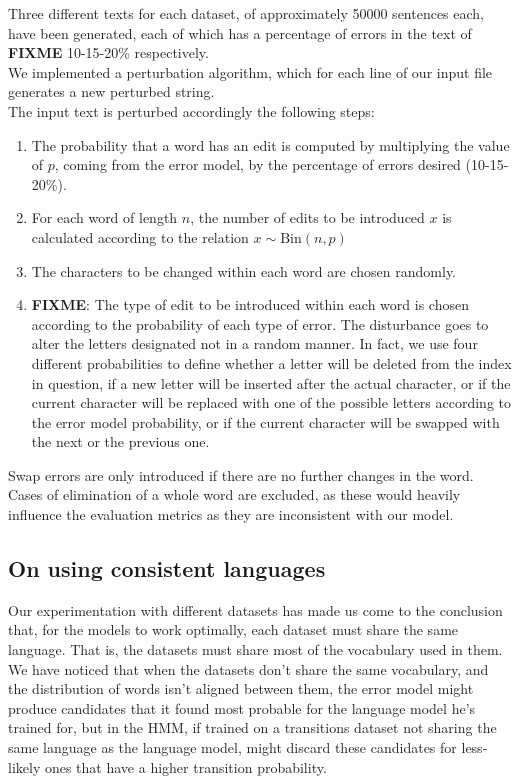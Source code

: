Three different texts for each dataset, of approximately \num{50000} sentences each, have been generated, 
each of which has a percentage of errors in the text of \textbf{FIXME} \num{10}-\num{15}-\num{20}\% 
respectively. \\

We implemented a perturbation algorithm, which for each line of our input file generates a new perturbed 
string.\\
The input text is perturbed accordingly the following steps:

\begin{enumerate}
	\item The probability that a word has an edit is computed by multiplying the value of $p$, coming from the 
	error model, by the percentage of errors desired (10-15-20\%).
	\item For each word of length $n$, the number of edits to be introduced $x$ is calculated according to the 
	relation $x \sim \text{Bin}(n, p)$
	\item The characters to be changed within each word are chosen randomly.
	\item \textbf{FIXME}: The type of edit to be introduced within each word is chosen according to the 
	probability of each type of error. 
	The disturbance goes to alter the letters designated not in a random manner. 
	In fact, we use four different probabilities to define whether a letter will be deleted from the index in question, 
	if a new letter will be inserted after the actual character, or if the current character will be replaced with one of 
	the possible letters according to the error model probability, or if the current character will be swapped with 
	the next or the previous one.
	
\end{enumerate}

Swap errors are only introduced if there are no further changes in the word. Cases of elimination of a whole 
word are excluded, as these would heavily influence the evaluation metrics as they are inconsistent with our 
model. 

\subsection{On using consistent languages}
Our experimentation with different datasets has made us come to the conclusion that, for the models to work 
optimally, each dataset must share the same language. That is, the datasets must share most of the vocabulary 
used in them. We have noticed that when the datasets don't share the same vocabulary, and the distribution of 
words isn't aligned between them, the error model might produce candidates that it found most probable for 
the language model he's trained for, but in the HMM, if trained on a transitions dataset not sharing the same 
language as the language model, might discard these candidates for less-likely ones that have a higher 
transition probability.


